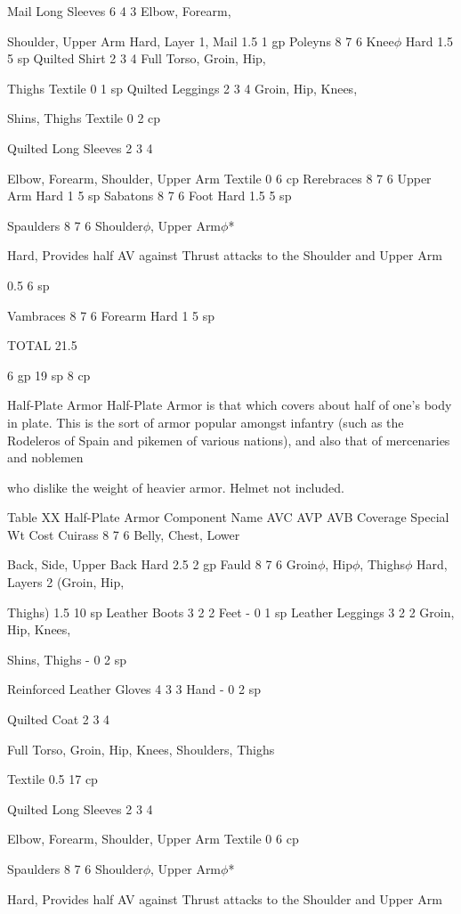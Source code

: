 \documentclass[oneside,11pt,english]{book}
\begin{document}
Mail Long Sleeves 6 4 3 Elbow, Forearm, 

Shoulder, Upper Arm Hard, Layer 1, Mail 1.5 1 gp
Poleyns 8 7 6 Knee$\phi$ Hard 1.5 5 sp
Quilted Shirt 2 3 4 Full Torso, Groin, Hip, 

Thighs Textile 0 1 sp
Quilted Leggings 2 3 4 Groin, Hip, Knees, 

Shins, Thighs Textile 0 2 cp

Quilted Long 
Sleeves 2 3 4

Elbow, Forearm, 
Shoulder, Upper Arm Textile 0 6 cp
Rerebraces 8 7 6 Upper Arm Hard 1 5 sp
Sabatons 8 7 6 Foot Hard 1.5 5 sp

Spaulders 8 7 6 Shoulder$\phi$, Upper Arm$\phi$*

Hard, Provides half AV against
Thrust attacks to the Shoulder 
and Upper Arm

0.5 6 sp

Vambraces 8 7 6 Forearm Hard 1 5 sp

TOTAL 21.5

6 gp
19 sp
8 cp

Half-Plate Armor
Half-Plate Armor is that which covers about half of one's body in plate. This is the sort of armor popular amongst 
infantry (such as the Rodeleros of Spain and pikemen of various nations), and also that of mercenaries and noblemen 


who dislike the weight of heavier armor. Helmet not included.

Table XX Half-Plate Armor 
Component Name AVC AVP AVB Coverage Special Wt Cost
Cuirass 8 7 6 Belly, Chest, Lower 

Back, Side, Upper Back Hard 2.5 2 gp
Fauld 8 7 6 Groin$\phi$, Hip$\phi$, Thighs$\phi$ Hard, Layers 2 (Groin, Hip, 

Thighs) 1.5 10 sp
Leather Boots 3 2 2 Feet - 0 1 sp
Leather Leggings 3 2 2 Groin, Hip, Knees, 

Shins, Thighs - 0 2 sp

Reinforced Leather
Gloves 4 3 3 Hand - 0 2 sp

Quilted Coat 2 3 4

Full Torso, Groin, Hip, 
Knees, Shoulders, 
Thighs

Textile 0.5 17 cp

Quilted Long 
Sleeves 2 3 4

Elbow, Forearm, 
Shoulder, Upper Arm Textile 0 6 cp

Spaulders 8 7 6 Shoulder$\phi$, Upper Arm$\phi$*

Hard, Provides half AV against
Thrust attacks to the Shoulder 
and Upper Arm
\end{document}
